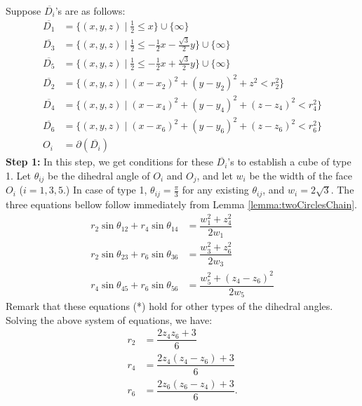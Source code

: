 \documentclass[suppldata, dvipdfmx]{interact}
\theoremstyle{plain}%
\theoremstyle{definition}
\theoremstyle{remark}
\theoremstyle{problemstyle}
\begin{document}
Suppose $\overline{D_i}$'s are as follows:
\begin{align*}
\overline{D_1}&= \{ (x,y,z) \mid \frac{1}{2} \le x \} \cup \{ \infty \}\\
\overline{D_3}&=\{(x,y,z) \mid \frac{1}{2} \le -\frac{1}{2}x-\frac{\sqrt{3}}{2}y \} \cup\{\infty\}\\
\overline{D_5}&=\{(x,y,z) \mid \frac{1}{2} \le -\frac{1}{2}x+\frac{\sqrt{3}}{2}y \} \cup\{\infty\}\\
\overline{D_2}&=\{(x,y,z) \mid (x-x_2)^2+(y-y_2)^2+z^2<r_2^2 \} \\
\overline{D_4}&=\{(x,y,z) \mid (x-x_4)^2+(y-y_4)^2+(z-z_4)^2<r_4^2 \} \\
\overline{D_6}&=\{(x,y,z) \mid (x-x_6)^2+(y-y_6)^2+(z-z_6)^2<r_6^2 \} \\
O_i &= \partial(\overline{D_i})
\end{align*}
%
%
{\bfseries Step 1:}
In this step, we get conditions for these $\overline{D_i}$'s to establish a cube of type 1. Let $\theta_{ij}$ be the dihedral angle of $O_i$ and $O_j$, and let $w_i$ be the width of the face $O_i$ ($i=1, 3, 5$.)  In case of type 1, $\theta_{ij}=\frac{\pi}{3}$ for any existing $\theta_{ij}$, and $w_i=2\sqrt{3}$. The three equations bellow follow immediately from Lemma \ref{lemma:twoCirclesChain}.
 \begin{align*}
 r_2\sin\theta_{12} + r_4\sin\theta_{14} &= \dfrac{w_1^2+z_4^2}{2w_1}\\
 r_2\sin\theta_{23} + r_6\sin\theta_{36} &= \dfrac{w_3^2+z_6^2}{2w_3}\tag{*}\\
 r_4\sin\theta_{45} + r_6\sin\theta_{56} &= \dfrac{w_5^2+(z_4 - z_6)^2}{2w_5}
 \end{align*}
  Remark that these equations (*) hold for other types of the dihedral angles. 
Solving the above system of equations, we have:
\begin{align*}
 r_2 &= \dfrac{2z_4z_6 + 3}{6} \\
 r_4 &= \dfrac{2z_4(z_4-z_6) + 3}{6} \tag{**}\\
 r_6 &= \dfrac{2z_6(z_6-z_4) + 3}{6}.
\end{align*}
\end{document}

